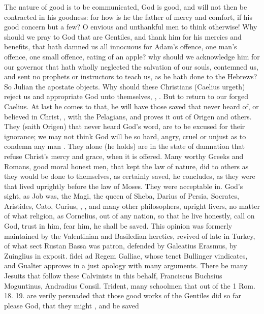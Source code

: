 {The nature of good is to be communicated, God is good, and will not
then be contracted in his goodness: for how is he the father of mercy
and comfort, if his good concern but a few? O envious and unthankful
men to think otherwise! Why should we pray to God that are
Gentiles, and thank him for his mercies and benefits, that hath damned
us all innocuous for Adam's offence, one man's offence, one small
offence, eating of an apple? why should we acknowledge him for our
governor that hath wholly neglected the salvation of our souls,
contemned us, and sent no prophets or instructors to teach us, as he
hath done to the Hebrews? So Julian the apostate objects. Why should
these Christians (Caelius urgeth) reject us and appropriate God unto
themselves, , \etc{}. But to return to our forged
Caelius. At last he comes to that, he will have those saved that never
heard of, or believed in Christ, , with the
Pelagians, and proves it out of Origen and others. They (saith
Origen) that never heard God's word, are to be excused for their
ignorance; we may not think God will be so hard, angry, cruel or unjust
as to condemn any man . They alone (he holds) are in the
state of damnation that refuse Christ's mercy and grace, when it is
offered. Many worthy Greeks and Romans, good moral honest men, that
kept the law of nature, did to others as they would be done to
themselves, as certainly saved, he concludes, as they were that lived
uprightly before the law of Moses. They were acceptable in. God's
sight, as Job was, the Magi, the queen of Sheba, Darius of Persia,
Socrates, Aristides, Cato, Curius, \Tully, \Seneca, and many other
philosophers, upright livers, no matter of what religion, as Cornelius,
out of any nation, so that he live honestly, call on God, trust in him,
fear him, he shall be saved. This opinion was formerly maintained by
the Valentinian and Basiledian heretics, revived of late in
Turkey, of what sect Rustan Bassa was patron, defended by
Galeatius Erasmus, by Zuinglius \textlatin{in exposit. fidei ad Regem
Galliae}, whose tenet Bullinger vindicates, and Gualter approves in a
just apology with many arguments. There be many Jesuits that follow
these Calvinists in this behalf, Franciscus Buchsius Moguntinus,
Andradius Consil. Trident, many schoolmen that out of the 1 Rom.  18.
19. are verily persuaded that those good works of the Gentiles did so
far please God, that they might , and be saved
}
